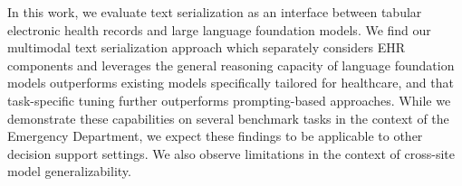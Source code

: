 \documentclass{article}
\theoremstyle{plain}
\theoremstyle{definition}
\theoremstyle{remark}
\begin{document}
In this work, we evaluate text serialization as an interface between tabular electronic health records and large language foundation models. We find our multimodal text serialization approach which separately considers EHR components and leverages the general reasoning capacity of language foundation models outperforms existing  models specifically tailored for healthcare, and that task-specific tuning further outperforms prompting-based approaches. While we demonstrate these capabilities on several benchmark tasks in the context of the Emergency Department, we expect these findings to be applicable to other decision support settings. We also observe limitations in the context of cross-site model generalizability.  






\end{document}

